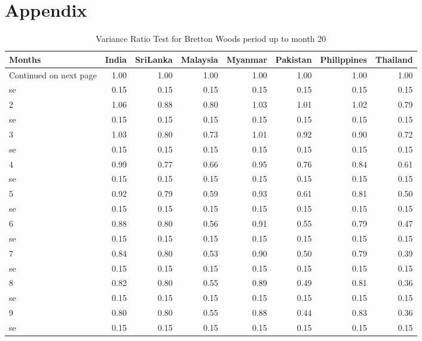 \documentclass[11pt,preprint, authoryear]{elsarticle}
\numberwithin{equation}{section}
\numberwithin{figure}{section}
\numberwithin{table}{section}
\begin{document}
\newpage

\hypertarget{appendix}{%
\section*{\texorpdfstring{Appendix
\label{A}}{Appendix }}\label{appendix}}

\begingroup\fontsize{12pt}{13pt}\selectfont
\begin{longtable}{lrrrrrrr}
\caption{Variance Ratio Test for Bretton Woods period up to month 20} \\ 
  \toprule
Months & India & SriLanka & Malaysia & Myanmar & Pakistan & Philippines & Thailand \\ 
  \hline 
\endhead 
\hline 
{\footnotesize Continued on next page} 
\endfoot 
\endlastfoot 
 \midrule
1 & 1.00 & 1.00 & 1.00 & 1.00 & 1.00 & 1.00 & 1.00 \\ 
  se & 0.15 & 0.15 & 0.15 & 0.15 & 0.15 & 0.15 & 0.15 \\ 
  2 & 1.06 & 0.88 & 0.80 & 1.03 & 1.01 & 1.02 & 0.79 \\ 
  se & 0.15 & 0.15 & 0.15 & 0.15 & 0.15 & 0.15 & 0.15 \\ 
  3 & 1.03 & 0.80 & 0.73 & 1.01 & 0.92 & 0.90 & 0.72 \\ 
  se & 0.15 & 0.15 & 0.15 & 0.15 & 0.15 & 0.15 & 0.15 \\ 
  4 & 0.99 & 0.77 & 0.66 & 0.95 & 0.76 & 0.84 & 0.61 \\ 
  se & 0.15 & 0.15 & 0.15 & 0.15 & 0.15 & 0.15 & 0.15 \\ 
  5 & 0.92 & 0.79 & 0.59 & 0.93 & 0.61 & 0.81 & 0.50 \\ 
  se & 0.15 & 0.15 & 0.15 & 0.15 & 0.15 & 0.15 & 0.15 \\ 
  6 & 0.88 & 0.80 & 0.56 & 0.91 & 0.55 & 0.79 & 0.47 \\ 
  se & 0.15 & 0.15 & 0.15 & 0.15 & 0.15 & 0.15 & 0.15 \\ 
  7 & 0.84 & 0.80 & 0.53 & 0.90 & 0.50 & 0.79 & 0.39 \\ 
  se & 0.15 & 0.15 & 0.15 & 0.15 & 0.15 & 0.15 & 0.15 \\ 
  8 & 0.82 & 0.80 & 0.55 & 0.89 & 0.49 & 0.81 & 0.36 \\ 
  se & 0.15 & 0.15 & 0.15 & 0.15 & 0.15 & 0.15 & 0.15 \\ 
  9 & 0.80 & 0.80 & 0.55 & 0.88 & 0.44 & 0.83 & 0.36 \\ 
  se & 0.15 & 0.15 & 0.15 & 0.15 & 0.15 & 0.15 & 0.15 \\ 

\end{longtable}
\end{document}
